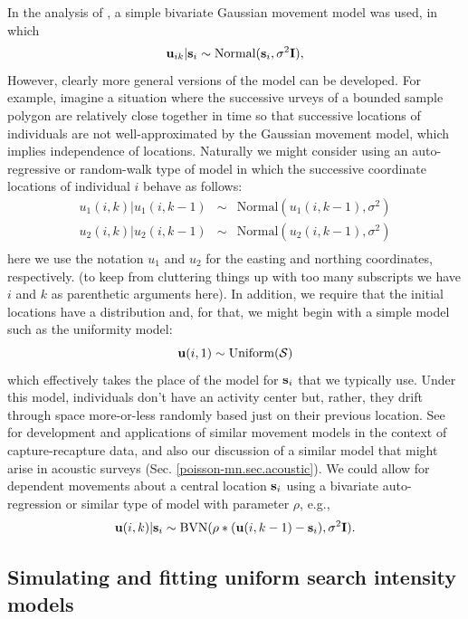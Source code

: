 In the analysis of \citet{royle_young:2008}, a simple bivariate
Gaussian movement model was used, in which
\[
 {\bf u}_{ik} | {\bf s}_{i} \sim \mbox{Normal}({\bf s}_{i}, \sigma^{2}{\bf I}),
\]
However, clearly more general versions of the model can be developed.
For example, imagine a situation where the successive urveys of a
bounded sample polygon are relatively close together in time so that
successive locations of individuals are not well-approximated by the
Gaussian movement model, which implies independence of
locations. Naturally we might consider using an auto-regressive or
random-walk type of model in which the successive coordinate locations
of individual $i$ behave as follows:
\begin{eqnarray*}
 u_{1}(i,k) | u_{1}(i,k-1) &\sim &  \mbox{Normal}( u_{1}(i,k-1),  \sigma^{2}) \\
 u_{2}(i,k) | u_{2}(i,k-1) &\sim &  \mbox{Normal}( u_{2}(i,k-1),  \sigma^{2}) \\
\end{eqnarray*}
here we use the notation $u_{1}$ and $u_{2}$ for the easting and
northing coordinates, respectively. (to keep from cluttering things up
with too many subscripts we have $i$ and $k$ as parenthetic arguments
here).  In addition, we require that the initial locations have a
distribution and, for that, we might begin with a simple model such as
the uniformity model:
\[
 {\bf u}(i,1) \sim \mbox{Uniform}({\cal S})
\]
which effectively takes the place of the model for ${\bf s}_{i}$ that
we typically use. Under this model, individuals don't have an activity
center but, rather, they drift through space more-or-less randomly
based just on their previous location. See \citet{ovaskainen:2004,
  ovaskainen:2008} for development and applications of similar
movement models in the context of capture-recapture data,
and also our discussion of a similar model that might arise in
acoustic surveys (Sec. \ref{poisson-mn.sec.acoustic}).  We could allow
for dependent movements about a central location ${\bf s}_{i}$ using a
bivariate auto-regression or similar type of model with parameter
$\rho$, e.g.,
\[
 {\bf u}(i,k) | {\bf s}_{i} \sim   \mbox{BVN}( \rho*( {\bf u}(i,k-1) - {\bf s}_{i} ),  \sigma^{2} {\bf I}).
\]


\subsection{Simulating and fitting uniform search intensity models}

